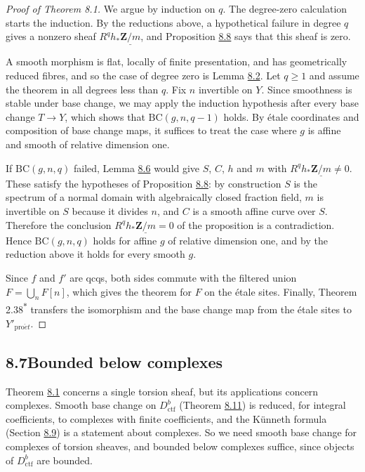 \documentclass[11pt]{article}
\newcommand{\bpout}[1]{#1\textsuperscript{\hyperlink{bp-outside}{\ensuremath{\ast}}}}
\begin{document}
\begin{proof}[{Proof of Theorem 8.1}]\label{bp35}%
We argue by induction on \(q\). The degree-zero calculation starts the induction. By the reductions above, a hypothetical failure in degree \(q\) gives a nonzero sheaf \(R^qh_*\underline{\mathbf Z/m}\), and Proposition \hyperref[bp32]{8.8} says that this sheaf is zero.

A smooth morphism is flat, locally of finite presentation, and has geometrically reduced fibres, and so the case of degree zero is Lemma \hyperref[bp11]{8.2}. Let \(q\geq1\) and assume the theorem in all degrees less than \(q\). Fix \(n\) invertible on \(Y\). Since smoothness is stable under base change, we may apply the induction hypothesis after every base change \(T\to Y\), which shows that \(\mathrm{BC}(g,n,q-1)\) holds. By étale coordinates and composition of base change maps, it suffices to treat the case where \(g\) is affine and smooth of relative dimension one.

If \(\mathrm{BC}(g,n,q)\) failed, Lemma \hyperref[bp26]{8.6} would give \(S\), \(C\), \(h\) and \(m\) with \(R^qh_*\underline{\mathbf Z/m}\neq0\). These satisfy the hypotheses of Proposition \hyperref[bp32]{8.8}: by construction \(S\) is the spectrum of a normal domain with algebraically closed fraction field, \(m\) is invertible on \(S\) because it divides \(n\), and \(C\) is a smooth affine curve over \(S\). Therefore the conclusion \(R^qh_*\underline{\mathbf Z/m}=0\) of the proposition is a contradiction. Hence \(\mathrm{BC}(g,n,q)\) holds for affine \(g\) of relative dimension one, and by the reduction above it holds for every smooth \(g\).

Since \(f\) and \(f'\) are qcqs, both sides commute with the filtered union \(F=\bigcup_nF[n]\), which gives the theorem for \(F\) on the étale sites. Finally, Theorem \bpout{2.38} transfers the isomorphism and the base change map from the étale sites to \(Y'_{\mathrm{pro}\acute{e}t}\).
\end{proof}


\subsection*{\texorpdfstring{8.7\quad Bounded below complexes}{8.7 Bounded below complexes}}
\label{bp36}%
\label{bp37}%
Theorem \hyperref[bp7]{8.1} concerns a single torsion sheaf, but its applications concern complexes. Smooth base change on \(D^b_{\mathrm{ctf}}\) (Theorem \hyperref[bp45]{8.11}) is reduced, for integral coefficients, to complexes with finite coefficients, and the Künneth formula (Section \hyperref[bp49]{8.9}) is a statement about complexes. So we need smooth base change for complexes of torsion sheaves, and bounded below complexes suffice, since objects of \(D^b_{\mathrm{ctf}}\) are bounded.
\end{document}
